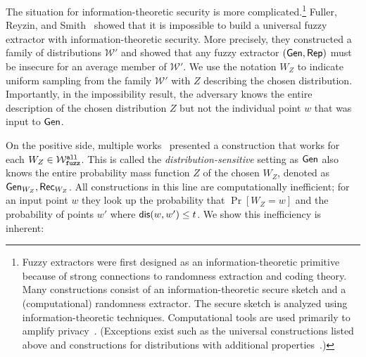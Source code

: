 The situation for information-theoretic security is more complicated.\footnote{Fuzzy extractors were first designed as an information-theoretic primitive because of strong connections to randomness extraction and coding theory.  Many constructions consist of an information-theoretic secure sketch and a (computational) randomness extractor.  The secure sketch is analyzed using information-theoretic techniques.  Computational tools are used primarily to amplify privacy~\cite{wen2018robustly,wen2019generic}.  (Exceptions exist such as the universal constructions listed above and constructions for distributions with additional properties~\cite{apon2017efficient,alamelou2018pseudoentropic,fuller2020computational,canetti2021reusable}.)
}  Fuller, Reyzin, and Smith~\cite{fuller2020fuzzy} showed that it is impossible to build a universal fuzzy extractor with information-theoretic security.  More precisely, they constructed a family of distributions $\mathcal{W}'$ and showed that any fuzzy extractor $({\mathsf{Gen}}, {\mathsf{Rep}})$ must be insecure for an average member of $\mathcal{W}'$. We use the notation $W_Z$ to indicate uniform sampling from the family $\mathcal{W}'$ with $Z$ describing the chosen distribution.  Importantly, in the impossibility result, the adversary knows the entire description of the chosen distribution $Z$ but not the individual point $w$ that was input to ${\mathsf{Gen}}$.

On the positive side, multiple works~\cite{hayashi2014secret,hayashi2016secret,fuller2016fuzzy,woodage2017new,tyagi2017universal,TVW18,LA18,fuller2019continuous,fuller2020fuzzy} presented a construction that works for each $W_Z\in \mathcal{W}_{\mathtt{fuzz}}^{\mathtt{all}}$.  This is called the \emph{distribution-sensitive} setting as ${\mathsf{Gen}}$ also knows the entire probability mass function $Z$ of the chosen $W_Z$, denoted as ${\mathsf{Gen}}_{W_Z}, {\mathsf{Rec}}_{W_Z}$.  All constructions in this line are computationally inefficient; for an input point $w$ they look up the probability that $\Pr[W_Z=w]$ and the probability of points $w'$ where $\mathsf{dis}(w, w')\le t$.  
We show this inefficiency is inherent:

